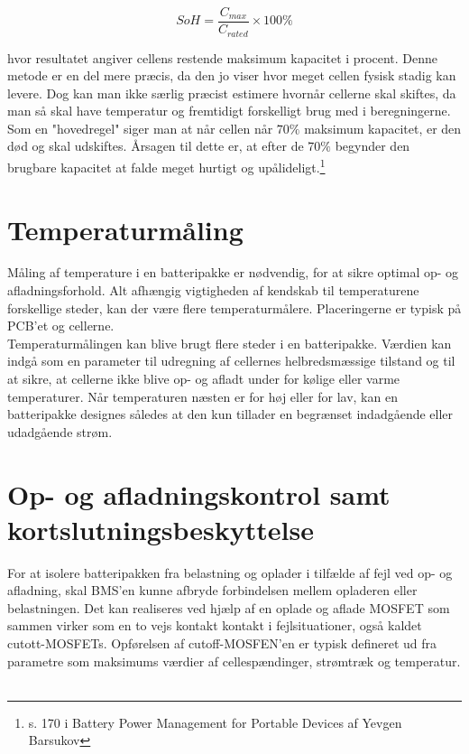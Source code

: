 \begin {equation} 
SoH = \frac{C_{max}}{C_{rated}}\times 100\percent \label{eq:soh_capacity}
\end {equation}

hvor resultatet angiver cellens restende maksimum kapacitet i procent. Denne metode er en del mere præcis, da den jo viser hvor meget cellen fysisk stadig kan levere. Dog kan man ikke særlig præcist estimere hvornår cellerne skal skiftes, da man så skal have temperatur og fremtidigt forskelligt brug med i beregningerne.\\ 

Som en "hovedregel" \space siger man at når cellen når $70\percent$ maksimum kapacitet, er den død og skal udskiftes. Årsagen til dette er, at efter de $70\percent$ begynder den brugbare kapacitet at falde meget hurtigt og upålideligt.\footnote{s. 170 i Battery Power Management for Portable Devices af Yevgen Barsukov}

\section{Temperaturmåling}
Måling af temperature i en batteripakke er nødvendig, for at sikre optimal op- og afladningsforhold. Alt afhængig vigtigheden af kendskab til temperaturene forskellige steder, kan der være flere temperaturmålere. Placeringerne er typisk på PCB'et og cellerne.
\\

Temperaturmålingen kan blive brugt flere steder i en batteripakke. Værdien kan indgå som en parameter til udregning af cellernes helbredsmæssige tilstand og til at sikre, at cellerne ikke blive op- og afladt under for kølige eller varme temperaturer. Når temperaturen næsten er for høj eller for lav, kan en batteripakke designes således at den kun tillader en begrænset indadgående eller udadgående strøm.

\section{Op- og afladningskontrol samt kortslutningsbeskyttelse}
For at isolere batteripakken fra belastning og oplader i tilfælde af fejl ved op- og afladning, skal BMS'en kunne afbryde forbindelsen mellem opladeren eller belastningen. Det kan realiseres ved hjælp af en oplade og aflade MOSFET som sammen virker som en to vejs kontakt kontakt i fejlsituationer, også kaldet cutott-MOSFETs. Opførelsen af cutoff-MOSFEN'en er typisk defineret ud fra parametre som maksimums værdier af cellespændinger, strømtræk og temperatur. 
\
